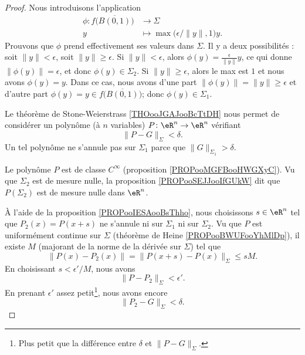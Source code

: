 \begin{proof}
	Nous introduisons l'application
	\begin{equation}
		\begin{aligned}
			\phi\colon f\big( \overline{B(0,1)} \big) & \to \Sigma                                   \\
			y                                         & \mapsto \max\big( \epsilon/\| y \|,1 \big)y.
		\end{aligned}
	\end{equation}
	Prouvons que \( \phi\) prend effectivement ses valeurs dans \( \Sigma\). Il y a deux possibilités : soit \( \| y \|<\epsilon\), soit \( \| y \|\geq \epsilon\). Si \( \| y \|<\epsilon\), alors \( \phi(y)=\frac{ \epsilon }{ \| y \| }y\), ce qui donne \( \| \phi(y) \|=\epsilon\), et donc \( \phi(y)\in \Sigma_2\). Si \( \| y \|\geq \epsilon\), alors le max est \( 1\) et nous avons \( \phi(y)=y\). Dans ce cas, nous avons d'une part \( \| \phi(y) \|=\| y \|\geq \epsilon\) et d'autre part \( \phi(y)=y\in f\big( \overline{B(0,1)} \big)\); donc \( \phi(y)\in \Sigma_1\).

	Le théorème de Stone-Weierstrass \ref{THOooJGAJooBcTtDH} nous permet de considérer un polynôme (à \( n\) variables) \(P \colon \eR^n\to \eR^n  \) vérifiant
	\begin{equation}
		\| P-G \|_{\Sigma}<\delta.
	\end{equation}
	Un tel polynôme ne s'annule pas sur \( \Sigma_1\) parce que \( \| G \|_{\Sigma_1}>\delta\).

	Le polynôme \( P\) est de classe \( C^{\infty}\) (proposition \ref{PROPooMGFBooHWGXyC}). Vu que \( \Sigma_2\) est de mesure nulle, la proposition \ref{PROPooSEJJooIfGUkW} dit que \( P(\Sigma_2)\) est de mesure nulle dans \( \eR^n\).

	À l'aide de la proposition \ref{PROPooIESAooBsThho}, nous choisissons \( s\in \eR^n\) tel que \( P_2(x)=P(x+s)\) ne s'annule ni sur \( \Sigma_1\) ni sur \( \Sigma_2\). Vu que \( P\) est uniformément continue sur \( \Sigma\) (théorème de Heine \ref{PROPooBWUFooYhMlDp}), il existe \( M\) (majorant de la norme de la dérivée sur \( \Sigma\)) tel que
	\begin{equation}
		\| P(x)-P_2(x) \|=\| P(x+s)-P(x) \|_{\Sigma}\leq sM.
	\end{equation}
	En choisissant \( s<\epsilon'/M\), nous avons
	\begin{equation}
		\| P-P_2 \|_{\Sigma}<\epsilon'.
	\end{equation}
	En prenant \( \epsilon'\) assez petit\footnote{Plus petit que la différence entre \( \delta\) et \( \| P-G \|_{\Sigma}\).}, nous avons encore
	\begin{equation}		\label{EQooIVQLooVjVzsA}
		\| P_2-G \|_{\Sigma}<\delta.
	\end{equation}


\end{proof}
